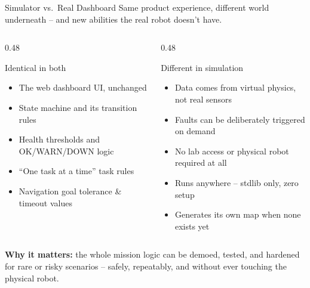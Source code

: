 \documentclass[aspectratio=169, 11pt]{beamer}
\begin{document}
\begin{frame}{Simulator vs.\ Real Dashboard}
  \small
  Same product experience, different world underneath -- and new abilities the real robot doesn't have.
  \vspace{0.2cm}
  \begin{columns}[T]
    \begin{column}{0.48\textwidth}
      \begin{block}{Identical in both}
        \footnotesize
        \begin{itemize}
          \item \textcolor{green!70!black}{The web dashboard UI, unchanged}
          \item \textcolor{green!70!black}{State machine and its transition rules}
          \item \textcolor{green!70!black}{Health thresholds and OK/WARN/DOWN logic}
          \item \textcolor{green!70!black}{``One task at a time'' task rules}
          \item \textcolor{green!70!black}{Navigation goal tolerance \& timeout values}
        \end{itemize}
      \end{block}
    \end{column}
    \begin{column}{0.48\textwidth}
      \begin{block}{Different in simulation}
        \footnotesize
        \begin{itemize}
          \item \textcolor{red!90!black}{Data comes from virtual physics, not real sensors}
          \item \textcolor{red!90!black}{Faults can be deliberately triggered on demand}
          \item \textcolor{red!90!black}{No lab access or physical robot required at all}
          \item \textcolor{red!90!black}{Runs anywhere -- stdlib only, zero setup}
          \item \textcolor{red!90!black}{Generates its own map when none exists yet}
        \end{itemize}
      \end{block}
    \end{column}
  \end{columns}
  \vspace{0.05cm}
  {\footnotesize \textbf{Why it matters:} the whole mission logic can be demoed, tested, and hardened for rare or risky scenarios -- safely, repeatably, and without ever touching the physical robot.}
\end{frame}
\end{document}
